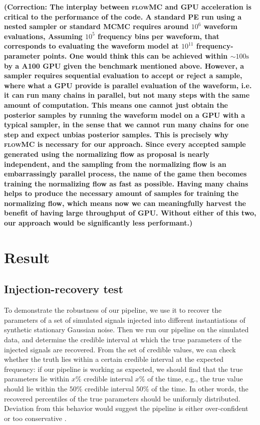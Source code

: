 \documentclass[twocolumn]{aastex631}
\newcommand{\corr}[1]{\textbf{\color{pyRed}(Correction: #1)}}
\begin{document}
\corr{The interplay between \textsc{flowMC} and GPU acceleration is critical to
the performance of the code. A standard PE run using a nested sampler or
standard MCMC requires around $10^6$ waveform evaluations, Assuming $10^5$
frequency bins per waveform, that corresponds to evaluating the waveform model
at $10^11$ frequency-parameter points. One would think this can be achieved
within $\sim 100\textrm{s}$ by a A100 GPU given the benchmark mentioned above.
However, a sampler requires sequential evaluation to accept or reject a sample,
where what a GPU provide is parallel evaluation of the waveform, i.e. it can run
many chains in parallel, but not many steps with the same amount of computation.
This means one cannot just obtain the posterior samples by running the waveform
model on a GPU with a typical sampler, in the sense that we cannot run many
chains for one step and expect unbias posterior samples.
This is precisely why \textsc{flowMC} is necessary for our approach. Since every
accepted sample generated using the normalizing flow as proposal is nearly independent,
and the sampling from the normalizing flow is an embarrassingly parallel
process, the name of the game then becomes training the normalizing flow as fast as
possible. Having many chains helps to produce the necessary amount of samples
for training the normalizing flow, which means now we can meaningfully harvest
the benefit of having large throughput of GPU. Without either of this two,
our approach would be significantly less performant.}

\section{Result}
\label{sec: Result}
\subsection{Injection-recovery test}

To demonstrate the robustness of our pipeline, we use it to recover the
parameters of a set of simulated signals injected into different instantiations
of synthetic stationary Gaussian noise. Then we run our pipeline on the
simulated data, and determine the credible interval at which the true
parameters of the injected signals are recovered. From the set of credible
values, we can check whether the truth lies within a certain credible interval
at the expected frequency: if our pipeline is working as expected, we should
find that the true parameters lie within $x\%$ credible interval $x\%$ of the
time, e.g., the true value should lie within the $50\%$ credible interval
$50\%$ of the time. In other words, the recovered percentiles of the true
parameters should be uniformly distributed. Deviation from this behavior would
suggest the pipeline is either over-confident or too conservative
\citep{Cook2006,Talts2018}.
\end{document}
